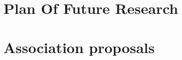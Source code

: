 \documentclass{RJWThesis}
\begin{document}
\chapter{Plan Of Future Research}


\cleardoublepage

\appendix
\chapter{Association proposals}\label{chap:App_AssocProposals}





\end{document}
